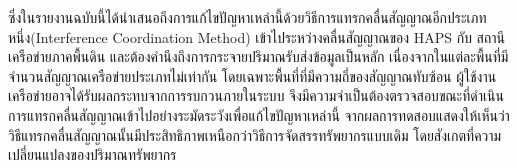 ซึ่งในรายงานฉบับนี้ได้นำเสนอถึงการแก้ไขปัญหาเหล่านี้ด้วยวิธีการแทรกคลื่นสัญญาณอีกประเภทหนึ่ง(Interference Coordination Method) เข้าไประหว่างคลื่นสัญญาณของ HAPS กับ สถานีเครือข่ายภาคพื้นดิน
และต้องคำนึงถึงการกระจายปริมาณรับส่งข้อมูลเป็นหลัก เนื่องจากในแต่ละพื้นที่มีจำนวนสัญญาณเครือข่ายประเภทไม่เท่ากัน โดยเฉพาะพื้นที่ที่มีความถี่ของสัญญาณทับซ้อน
ผู้ใช้งานเครือข่ายอาจได้รับผลกระทบจากการรบกวนภายในระบบ จึงมีความจำเป็นต้องตรวจสอบขณะที่ดำเนินการแทรกคลื่นสัญญาณเข้าไปอย่างระมัดระวังเพื่อแก้ไขปัญหาเหล่านี้
จากผลการทดสอบแสดงให้เห็นว่าวิธีแทรกคลื่นสัญญาณนั้นมีประสิทธิภาพเหนือกว่าวิธีการจัดสรรทรัพยากรแบบเดิม โดยสังเกตที่ความเปลี่ยนแปลงของปริมาณทรัพยากร
